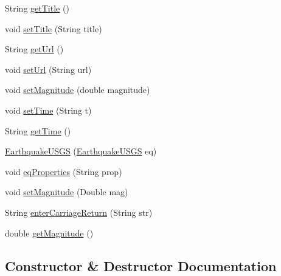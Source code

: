\begin{DoxyCompactItemize}
String \hyperlink{classbridges_1_1data__src__dependent_1_1_earthquake_u_s_g_s_a6aa71b4b565be3971c8d3dfae31cb6ed}{get\+Title} ()
\item 
void \hyperlink{classbridges_1_1data__src__dependent_1_1_earthquake_u_s_g_s_a0432f641e0089fc004c441b7239ad6a0}{set\+Title} (String title)
\item 
String \hyperlink{classbridges_1_1data__src__dependent_1_1_earthquake_u_s_g_s_a2af3938390c31096329e635510df437e}{get\+Url} ()
\item 
void \hyperlink{classbridges_1_1data__src__dependent_1_1_earthquake_u_s_g_s_aaa9d26333e7b80d0f72da58ea2ad41d1}{set\+Url} (String url)
\item 
void \hyperlink{classbridges_1_1data__src__dependent_1_1_earthquake_u_s_g_s_ad7902d80cbbe11046858db1f2792e99d}{set\+Magnitude} (double magnitude)
\item 
void \hyperlink{classbridges_1_1data__src__dependent_1_1_earthquake_u_s_g_s_ae3813930d3468eff007521f33c8e2139}{set\+Time} (String t)
\item 
String \hyperlink{classbridges_1_1data__src__dependent_1_1_earthquake_u_s_g_s_a03397a4410818546c5232f46a3d4ffc4}{get\+Time} ()
\item 
\hyperlink{classbridges_1_1data__src__dependent_1_1_earthquake_u_s_g_s_a6b9281a299d6e60736355eb8833f9e0d}{Earthquake\+U\+S\+GS} (\hyperlink{classbridges_1_1data__src__dependent_1_1_earthquake_u_s_g_s}{Earthquake\+U\+S\+GS} eq)
\item 
void \hyperlink{classbridges_1_1data__src__dependent_1_1_earthquake_u_s_g_s_acc0ba6890ee5963f88a399523f009ae4}{eq\+Properties} (String prop)
\item 
void \hyperlink{classbridges_1_1data__src__dependent_1_1_earthquake_u_s_g_s_a34a4c6ebe01c5daa7c86b3a4207d633f}{set\+Magnitude} (Double mag)
\item 
String \hyperlink{classbridges_1_1data__src__dependent_1_1_earthquake_u_s_g_s_aade0ce9a2fee927b015f5eb495c481e1}{enter\+Carriage\+Return} (String str)
\item 
double \hyperlink{classbridges_1_1data__src__dependent_1_1_earthquake_u_s_g_s_a3ec5d753277d6287b222448ff2477291}{get\+Magnitude} ()
\end{DoxyCompactItemize}


\subsection{Constructor \& Destructor Documentation}
\mbox{\label{classbridges_1_1data__src__dependent_1_1_earthquake_u_s_g_s_a1803f7d357ce045cefbc923e096e9646}} 
